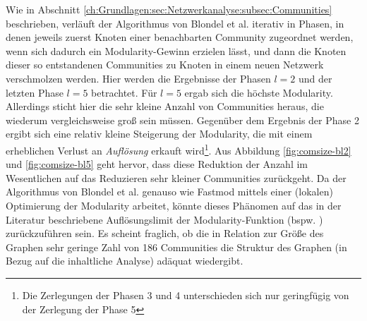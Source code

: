 Wie in Abschnitt
\ref{ch:Grundlagen:sec:Netzwerkanalyse:subsec:Communities}
beschrieben, verläuft der Algorithmus von Blondel et al. iterativ in
Phasen, in denen jeweils zuerst Knoten einer benachbarten Community
zugeordnet werden, wenn sich dadurch ein Modularity-Gewinn erzielen
lässt, und dann die Knoten dieser so entstandenen Communities zu
Knoten in einem neuen Netzwerk verschmolzen werden. Hier werden die
Ergebnisse der Phasen $l=2$ und der letzten Phase $l=5$
betrachtet. Für $l=5$ ergab sich die höchste
Modularity. Allerdings sticht hier die sehr kleine Anzahl von
Communities heraus, die wiederum vergleichsweise groß sein
müssen. Gegenüber dem Ergebnis der Phase 2 ergibt sich eine
relativ kleine Steigerung der Modularity, die mit einem erheblichen
Verlust an \emph{Auflösung} erkauft wird\footnote{Die Zerlegungen
  der Phasen 3 und 4 unterschieden sich nur geringfügig von der
  Zerlegung der Phase 5}. Aus Abbildung \ref{fig:comsize-bl2} und
\ref{fig:comsize-bl5} geht hervor, dass diese Reduktion der Anzahl im
Wesentlichen auf das Reduzieren sehr kleiner Communities
zurückgeht. Da der Algorithmus von Blondel et al. genauso wie
Fastmod mittels einer (lokalen) Optimierung der Modularity arbeitet,
könnte dieses Phänomen auf das in der Literatur beschriebene
Auflösungslimit der Modularity-Funktion (bspw. \cite{Fortunato2007}
\cite{Good2009}) zurückzuführen sein. Es scheint fraglich, ob die
in Relation zur Größe des Graphen sehr geringe Zahl von 186
Communities die Struktur des Graphen (in Bezug auf die inhaltliche
Analyse) adäquat wiedergibt.


